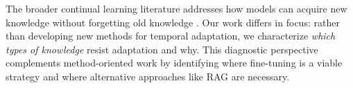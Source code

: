 The broader continual learning literature addresses how models can acquire new knowledge without forgetting old knowledge \citep{jang2022temporalwiki}. Our work differs in focus: rather than developing new methods for temporal adaptation, we characterize \emph{which types of knowledge} resist adaptation and why. This diagnostic perspective complements method-oriented work by identifying where fine-tuning is a viable strategy and where alternative approaches like RAG \citep{lewis2020rag} are necessary.
